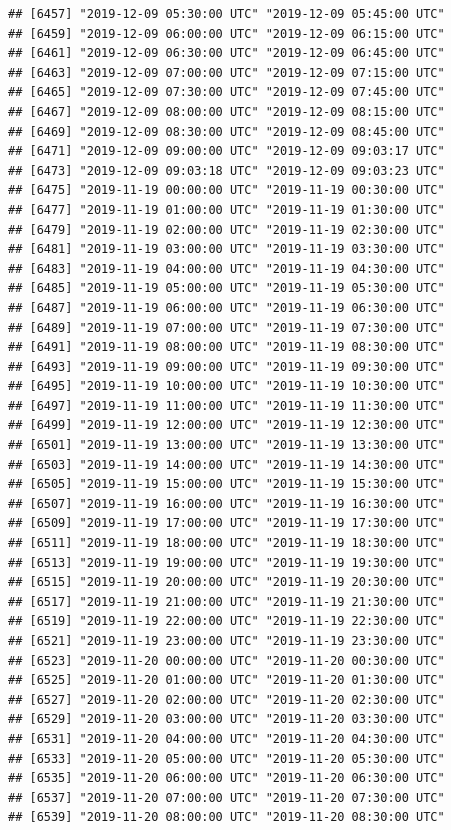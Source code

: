 \documentclass{article}\usepackage[]{graphicx}\usepackage[]{color}
\makeatletter
\newenvironment{kframe}{%
 \def\at@end@of@kframe{}%
 \ifinner\ifhmode%
  \def\at@end@of@kframe{\end{minipage}}%
  \begin{minipage}{\columnwidth}%
 \fi\fi%
 \def\FrameCommand##1{\hskip\@totalleftmargin \hskip-\fboxsep
 \colorbox{shadecolor}{##1}\hskip-\fboxsep
     \hskip-\linewidth \hskip-\@totalleftmargin \hskip\columnwidth}%
 \MakeFramed {\advance\hsize-\width
   \@totalleftmargin\z@ \linewidth\hsize
   \@setminipage}}%
 {\par\unskip\endMakeFramed%
 \at@end@of@kframe}
\newenvironment{knitrout}{}{} %
\makeatother
\begin{document}
\begin{knitrout}
\begin{kframe}
\begin{verbatim}
## [6457] "2019-12-09 05:30:00 UTC" "2019-12-09 05:45:00 UTC"
## [6459] "2019-12-09 06:00:00 UTC" "2019-12-09 06:15:00 UTC"
## [6461] "2019-12-09 06:30:00 UTC" "2019-12-09 06:45:00 UTC"
## [6463] "2019-12-09 07:00:00 UTC" "2019-12-09 07:15:00 UTC"
## [6465] "2019-12-09 07:30:00 UTC" "2019-12-09 07:45:00 UTC"
## [6467] "2019-12-09 08:00:00 UTC" "2019-12-09 08:15:00 UTC"
## [6469] "2019-12-09 08:30:00 UTC" "2019-12-09 08:45:00 UTC"
## [6471] "2019-12-09 09:00:00 UTC" "2019-12-09 09:03:17 UTC"
## [6473] "2019-12-09 09:03:18 UTC" "2019-12-09 09:03:23 UTC"
## [6475] "2019-11-19 00:00:00 UTC" "2019-11-19 00:30:00 UTC"
## [6477] "2019-11-19 01:00:00 UTC" "2019-11-19 01:30:00 UTC"
## [6479] "2019-11-19 02:00:00 UTC" "2019-11-19 02:30:00 UTC"
## [6481] "2019-11-19 03:00:00 UTC" "2019-11-19 03:30:00 UTC"
## [6483] "2019-11-19 04:00:00 UTC" "2019-11-19 04:30:00 UTC"
## [6485] "2019-11-19 05:00:00 UTC" "2019-11-19 05:30:00 UTC"
## [6487] "2019-11-19 06:00:00 UTC" "2019-11-19 06:30:00 UTC"
## [6489] "2019-11-19 07:00:00 UTC" "2019-11-19 07:30:00 UTC"
## [6491] "2019-11-19 08:00:00 UTC" "2019-11-19 08:30:00 UTC"
## [6493] "2019-11-19 09:00:00 UTC" "2019-11-19 09:30:00 UTC"
## [6495] "2019-11-19 10:00:00 UTC" "2019-11-19 10:30:00 UTC"
## [6497] "2019-11-19 11:00:00 UTC" "2019-11-19 11:30:00 UTC"
## [6499] "2019-11-19 12:00:00 UTC" "2019-11-19 12:30:00 UTC"
## [6501] "2019-11-19 13:00:00 UTC" "2019-11-19 13:30:00 UTC"
## [6503] "2019-11-19 14:00:00 UTC" "2019-11-19 14:30:00 UTC"
## [6505] "2019-11-19 15:00:00 UTC" "2019-11-19 15:30:00 UTC"
## [6507] "2019-11-19 16:00:00 UTC" "2019-11-19 16:30:00 UTC"
## [6509] "2019-11-19 17:00:00 UTC" "2019-11-19 17:30:00 UTC"
## [6511] "2019-11-19 18:00:00 UTC" "2019-11-19 18:30:00 UTC"
## [6513] "2019-11-19 19:00:00 UTC" "2019-11-19 19:30:00 UTC"
## [6515] "2019-11-19 20:00:00 UTC" "2019-11-19 20:30:00 UTC"
## [6517] "2019-11-19 21:00:00 UTC" "2019-11-19 21:30:00 UTC"
## [6519] "2019-11-19 22:00:00 UTC" "2019-11-19 22:30:00 UTC"
## [6521] "2019-11-19 23:00:00 UTC" "2019-11-19 23:30:00 UTC"
## [6523] "2019-11-20 00:00:00 UTC" "2019-11-20 00:30:00 UTC"
## [6525] "2019-11-20 01:00:00 UTC" "2019-11-20 01:30:00 UTC"
## [6527] "2019-11-20 02:00:00 UTC" "2019-11-20 02:30:00 UTC"
## [6529] "2019-11-20 03:00:00 UTC" "2019-11-20 03:30:00 UTC"
## [6531] "2019-11-20 04:00:00 UTC" "2019-11-20 04:30:00 UTC"
## [6533] "2019-11-20 05:00:00 UTC" "2019-11-20 05:30:00 UTC"
## [6535] "2019-11-20 06:00:00 UTC" "2019-11-20 06:30:00 UTC"
## [6537] "2019-11-20 07:00:00 UTC" "2019-11-20 07:30:00 UTC"
## [6539] "2019-11-20 08:00:00 UTC" "2019-11-20 08:30:00 UTC"

\end{verbatim}
\end{kframe}
\end{knitrout}
\end{document}
